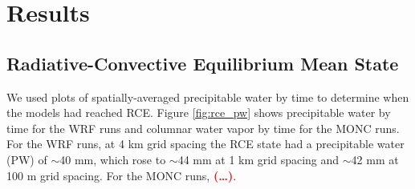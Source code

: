 \documentclass[draft]{agujournal2019}
\newcommand{\todo}[1]{\textcolor{red}{\textbf{(#1)}}}
\begin{document}
\section{Results}
\label{sec:results}

\subsection{Radiative-Convective Equilibrium Mean State}

We used plots of spatially-averaged precipitable water by time to determine when
the models had reached RCE. Figure \ref{fig:rce_pw} shows precipitable water by
time for the WRF runs and columnar water vapor by time for the MONC runs. For
the WRF runs, at 4 km grid spacing the RCE state had a precipitable water (PW)
of $\sim$40 mm, which rose to $\sim$44 mm at 1 km grid spacing and $\sim$42 mm
at 100 m grid spacing. For the MONC runs, \todo{\ldots}.
\end{document}
